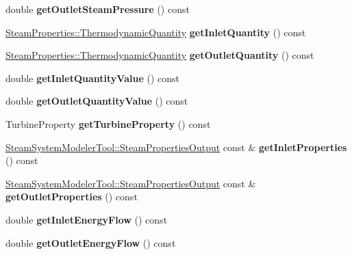 \begin{DoxyCompactItemize}
double {\bfseries get\+Outlet\+Steam\+Pressure} () const
\item 
\mbox{\label{class_turbine_ac9e91d9539cea5cd1e0037c397c28c78}} 
\hyperlink{class_steam_properties_ae0294bedf7d178c2d8fb6aed0f62fbff}{Steam\+Properties\+::\+Thermodynamic\+Quantity} {\bfseries get\+Inlet\+Quantity} () const
\item 
\mbox{\label{class_turbine_acd3e98ab67754b652de97498d9bec6d2}} 
\hyperlink{class_steam_properties_ae0294bedf7d178c2d8fb6aed0f62fbff}{Steam\+Properties\+::\+Thermodynamic\+Quantity} {\bfseries get\+Outlet\+Quantity} () const
\item 
\mbox{\label{class_turbine_a3d8a3f317fa71abb3404144371615725}} 
double {\bfseries get\+Inlet\+Quantity\+Value} () const
\item 
\mbox{\label{class_turbine_aca98f128213e02e95dfd6f4b2ad8de4e}} 
double {\bfseries get\+Outlet\+Quantity\+Value} () const
\item 
\mbox{\label{class_turbine_a14f6eff49b501aa8c5a22d404dbeaac0}} 
Turbine\+Property {\bfseries get\+Turbine\+Property} () const
\item 
\mbox{\label{class_turbine_a7a906cf74affed9acfa4045964eccbf6}} 
\hyperlink{struct_steam_system_modeler_tool_1_1_steam_properties_output}{Steam\+System\+Modeler\+Tool\+::\+Steam\+Properties\+Output} const  \& {\bfseries get\+Inlet\+Properties} () const
\item 
\mbox{\label{class_turbine_aa9449622449e78285a258823ff77c8ec}} 
\hyperlink{struct_steam_system_modeler_tool_1_1_steam_properties_output}{Steam\+System\+Modeler\+Tool\+::\+Steam\+Properties\+Output} const  \& {\bfseries get\+Outlet\+Properties} () const
\item 
\mbox{\label{class_turbine_ae5d55a7b882e4780d490d43409f8f06c}} 
double {\bfseries get\+Inlet\+Energy\+Flow} () const
\item 
\mbox{\label{class_turbine_aa20c0f9dd81cd9bfd5eda77f588516b5}} 
double {\bfseries get\+Outlet\+Energy\+Flow} () const
\item 

\end{DoxyCompactItemize}
